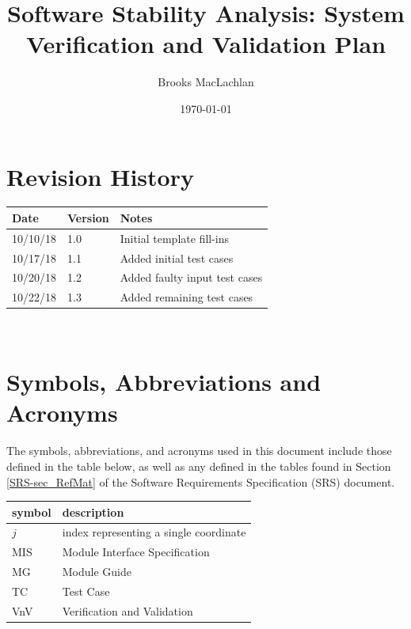 \documentclass[12pt, titlepage]{article}
\begin{document}
\title{Software Stability Analysis: System Verification and Validation Plan} 
\author{Brooks MacLachlan}
\date{\today}
	
\maketitle


\section{Revision History}

\begin{tabularx}{\textwidth}{p{3cm}p{2cm}X}
\toprule {\bf Date} & {\bf Version} & {\bf Notes}\\
\midrule
10/10/18 & 1.0 & Initial template fill-ins\\
10/17/18 & 1.1 & Added initial test cases\\
10/20/18 & 1.2 & Added faulty input test cases\\
10/22/18 & 1.3 & Added remaining test cases\\
\bottomrule
\end{tabularx}

~\newpage

\section{Symbols, Abbreviations and Acronyms}
The symbols, abbreviations, and acronyms used in this document include those 
defined in the table below, as well as any defined in the tables found in 
Section \ref{SRS-sec_RefMat} of the Software Requirements Specification (SRS) 
document.
\newline

\renewcommand{\arraystretch}{1.2}
\begin{tabular}{l l} 
  \toprule		
  \textbf{symbol} & \textbf{description}\\
  \midrule 
  $j$ & index representing a single coordinate\\
  MIS & Module Interface Specification\\
  MG & Module Guide\\
  TC & Test Case\\
  VnV & Verification and Validation\\
  \bottomrule
\end{tabular}\\
\end{document}

